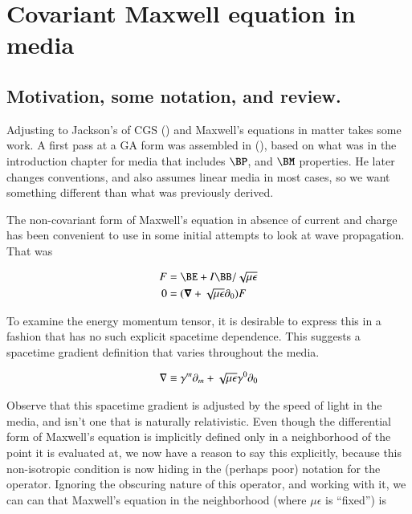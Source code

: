 %

\chapter{Covariant Maxwell equation in media}
\label{chap:covariantMedia}
{}
\date{Aug 10, 2009}

\beginArtWithToc

\section{Motivation, some notation, and review.}

Adjusting to Jackson's of CGS (\citep{jackson1975cew}) and Maxwell's equations in matter takes some work.  A first pass at a GA form was assembled in (), based on what was in the introduction chapter for media that includes $\BP$, and $\BM$ properties.  He later changes conventions, and also assumes linear media in most cases, so we want something different than what was previously derived.

The non-covariant form of Maxwell's equation in absence of current and charge has been convenient to use in some initial attempts to look at wave propagation.  That was

\begin{align}\label{eqn:covariantMedia:foo1}
F &= \BE + I\BB/\sqrt{\mu\epsilon} \\
0 &= (\spacegrad + \sqrt{\mu\epsilon} \partial_0) F
\end{align}

To examine the energy momentum tensor, it is desirable to express this in a fashion that has no such explicit spacetime dependence.  This suggests a spacetime gradient definition that varies throughout the media.

\begin{align}\label{eqn:covariantMedia:foo2}
\nabla \equiv \gamma^m \partial_m + \sqrt{\mu\epsilon} \gamma^0 \partial_0
\end{align}

Observe that this spacetime gradient is adjusted by the speed of light in the media, and isn't one that is naturally relativistic.  Even though the differential form of Maxwell's equation is implicitly defined only in a neighborhood of the point it is evaluated at, we now have a reason to say this explicitly, because this non-isotropic condition is now hiding in the (perhaps poor) notation for the operator.  Ignoring the obscuring nature of this operator, and working with it, we can can that Maxwell's equation in the neighborhood (where $\mu\epsilon$ is ``fixed'') is

